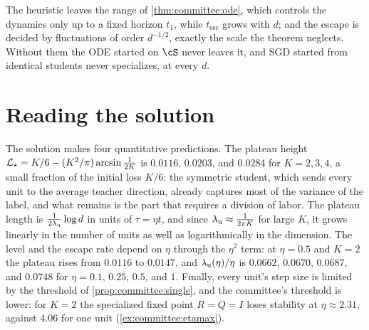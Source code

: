 \begin{refsection}
The heuristic leaves the range of \cref{thm:committee:ode}, which controls the dynamics only up to a fixed horizon $t_1$, while $t_{\mathrm{esc}}$ grows with $d$; and the escape is decided by fluctuations of order $d^{-1/2}$, exactly the scale the theorem neglects. Without them the ODE started on $\cS$ never leaves it, and SGD started from identical students never specializes, at every $d$.

\section{Reading the solution}\label{sec:committee:reading}

The solution makes four quantitative predictions. The plateau height $\mathcal{L}_\star=K/6-(K^2/\pi)\arcsin\frac1{2K}$ is $0.0116$, $0.0203$, and $0.0284$ for $K=2,3,4$, a small fraction of the initial loss $K/6$: the symmetric student, which sends every unit to the average teacher direction, already captures most of the variance of the label, and what remains is the part that requires a division of labor. The plateau length is $\frac1{2\lambda_{\mathrm u}}\log d$ in units of $\tau=\eta t$, and since $\lambda_{\mathrm u}\approx\frac1{2\pi K}$ for large $K$, it grows linearly in the number of units as well as logarithmically in the dimension. The level and the escape rate depend on $\eta$ through the $\eta^2$ term: at $\eta=0.5$ and $K=2$ the plateau rises from $0.0116$ to $0.0147$, and $\lambda_{\mathrm u}(\eta)/\eta$ is $0.0662$, $0.0670$, $0.0687$, and $0.0748$ for $\eta=0.1$, $0.25$, $0.5$, and $1$. Finally, every unit's step size is limited by the threshold of \cref{prop:committee:single}, and the committee's threshold is lower: for $K=2$ the specialized fixed point $R=Q=I$ loses stability at $\eta\approx2.31$, against $4.06$ for one unit (\cref{ex:committee:etamax}).


\end{refsection}
